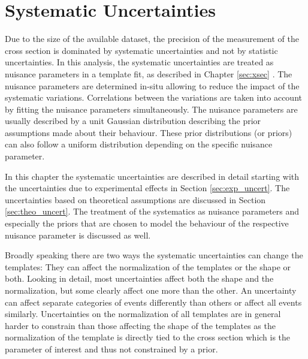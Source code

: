 
\chapter{Systematic Uncertainties}
\label{sec:syst_uncert}

Due to the size of the available dataset, the precision of the measurement of the \ttbar cross section is dominated by systematic uncertainties and not by statistic uncertainties.
In this analysis, the systematic uncertainties are treated as nuisance parameters in a
template fit, as described in Chapter \ref{sec:xsec} . The nuisance parameters are determined in-situ allowing to reduce the impact of the systematic variations. 
Correlations between the variations are taken into account by fitting the nuisance parameters simultaneously.
The nuisance parameters are usually described by a unit Gaussian distribution describing the prior assumptions made about their behaviour.
These prior distributions (or priors) can also follow a uniform distribution depending on the specific nuisance parameter.

In this chapter the systematic uncertainties are described in detail starting with the uncertainties due to experimental effects in Section \ref{sec:exp_uncert}.
The uncertainties based on theoretical assumptions are discussed in Section \ref{sec:theo_uncert}. The treatment of the systematics as nuisance
parameters and especially the priors that are chosen to model the behaviour of the respective nuisance parameter is discussed as well.

Broadly speaking there are two ways the systematic uncertainties can change the templates: They can affect the normalization of the templates or the shape or both.
Looking in detail, most uncertainties affect both the shape and the normalization, but some clearly affect one more than the other.
An uncertainty can affect separate categories of events differently than others or affect all events similarly.
Uncertainties on the normalization of all templates are in general harder to constrain than those affecting the shape of the templates as the normalization of the
\ttbar template is directly tied to the cross section which is the parameter of interest and thus not constrained by a prior. 

